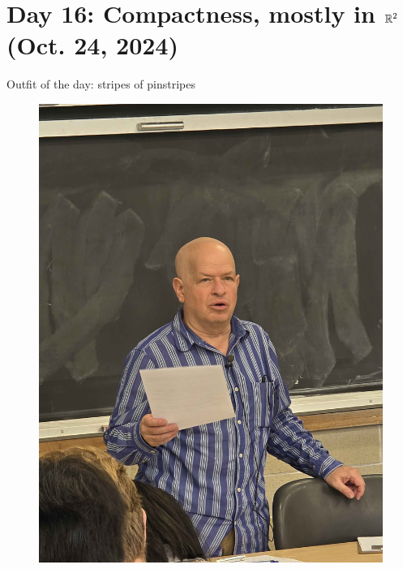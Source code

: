 \section{Day 16: Compactness, mostly in \texorpdfstring{$\mathbb R^2$}{R2} (Oct. 24, 2024)}
Outfit of the day: stripes of pinstripes
\begin{figure}[h]
    \centering
    \includegraphics[scale=0.1]{MAT327 Notes/Dror Shirts/dror day 16 shirt.jpg}
\end{figure}

